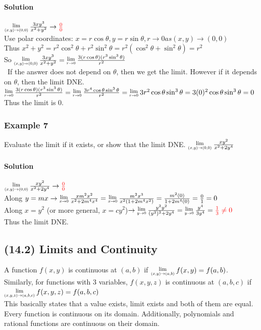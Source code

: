 \documentclass{article}
\newcommand{\Lim}[1]{\raisebox{0.5ex}{\scalebox{0.8}{$\displaystyle \lim_{#1}\;$}}}
\begin{document}
\paragraph{Solution} $\Lim{(x,y)\to(0,0)}\frac{3xy^3}{x^2+y^2}\rightarrow\textcolor{red}{\frac{0}{0}}$
\\Use polar coordinates: $x=r\cos\theta, y=r\sin\theta, r\to0 as (x,y)\to(0,0)$
\\Thus $x^2+y^2=r^2\cos^2\theta+r^2\sin^2\theta=r^2(\cos^2\theta+\sin^2\theta)=r^2$
\\So $\Lim{(x,y)\to(0,0)}\frac{3xy^3}{x^2+y^2}=\Lim{r\to0}\frac{3(r\cos\theta)(r^3\sin^3\theta)}{r^2}$
\\\textbullet\ If the answer does not depend on $\theta$, then we get the limit. However if it depends on $\theta$, then the limit DNE.
\\$\Lim{r\to0}\frac{3(r\cos\theta)(r^3\sin^3\theta)}{r^2}=\Lim{r\to0}\frac{3r^4\cos\theta\sin^3\theta}{r^2}=\Lim{r\to0}3r^2\cos\theta\sin^3\theta=3(0)^2\cos\theta\sin^3\theta=0$
\\Thus the limit is 0.

\subsubsection{Example 7}
Evaluate the limit if it exists, or show that the limit DNE. $\Lim{(x,y)\to(0,0)}\frac{xy^2}{x^2+2y^4}$
\paragraph{Solution} $\Lim{(x,y)\to(0,0)}\frac{xy^2}{x^2+2y^4}\to\textcolor{red}{\frac{0}{0}}$
\\Along $y=mx\to\Lim{x\to0}\frac{xm^2x^2}{x^2+2m^4x^4}=\Lim{x\to0}\frac{m^2x^3}{x^2(1+2m^4x^2)}=\frac{m^2(0)}{1+2m^4(0)}=\frac{0}{1}=0$
\\Along $x=y^2$ (or more general, $x=cy^2$)$\to\Lim{y\to0}\frac{y^2y^2}{(y^2)^2+2y^4}=\Lim{y\to0}\frac{y^4}{3y^4}=\textcolor{red}{\frac{1}{3}\neq0}$
\\Thus the limit DNE.

\newpage\subsection{(14.2) Limits and Continuity}
A function $f(x,y)$ is continuous at $(a,b)$ if $\Lim{(x,y)\to(a,b)}f(x,y)=f(a,b)$.
Similarly, for functions with 3 variables, $f(x,y,z)$ is continuous at $(a,b,c)$ if $\Lim{(x,y,z)\to(a,b,c)}f(x,y,z)=f(a,b,c)$
\\This basically states that a value exists, limit exists and both of them are equal. Every function is continuous on its domain.
Additionally, polynomials and rational functions are continuous on their domain.
\end{document}
